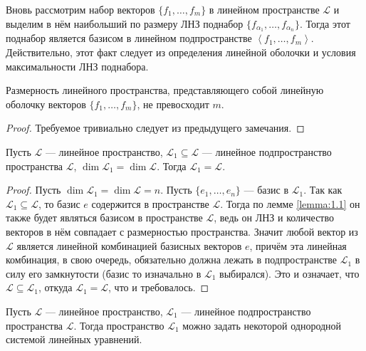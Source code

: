 \documentclass[11pt]{article}
\begin{document}
\begin{remark}
    Вновь рассмотрим набор векторов $\{f_1, \ldots, f_m\}$ в линейном пространстве $\mathcal{L}$ и выделим в нём 
    наибольший по размеру ЛНЗ поднабор $\{f_{\alpha_1}, \ldots, f_{\alpha_n}\}$. Тогда этот поднабор 
    является базисом в линейном подпространстве $\left\langle f_1, \ldots, f_m \right\rangle$. Действительно, этот 
    факт следует из определения линейной оболочки и условия максимальности ЛНЗ поднабора.
\end{remark}

\begin{lemma}
    Размерность линейного пространства, представляющего собой линейную оболочку векторов $\{f_1, \ldots, f_m\}$, не 
    превосходит $m$.
\end{lemma}

\begin{proof}
    Требуемое тривиально следует из предыдущего замечания.
\end{proof}

\begin{lemma}
    Пусть $\mathcal{L}$ --- линейное пространство, $\mathcal{L}_1 \subseteq \mathcal{L}$ --- линейное подпространство пространства $\mathcal{L}$, $\dim \mathcal{L}_1 = \dim \mathcal{L}$. Тогда $\mathcal{L}_1 = \mathcal{L}$.
\end{lemma}

\begin{proof}
    Пусть $\dim \mathcal{L}_1 = \dim \mathcal{L} = n$. Пусть $\{e_1, \ldots, e_n\}$ --- базис в $\mathcal{L}_1$. Так как $\mathcal{L}_1 \subseteq \mathcal{L}$, то базис $e$ содержится в пространстве $\mathcal{L}$.
    Тогда по лемме \ref{lemma:1.1} он также будет являться базисом в пространстве $\mathcal{L}$, ведь он ЛНЗ и количество векторов в нём совпадает с размерностью пространства. Значит любой 
    вектор из $\mathcal{L}$ является линейной комбинацией базисных векторов $e$, причём эта линейная комбинация, в свою очередь, обязательно должна лежать в подпространстве $\mathcal{L}_1$ в силу его замкнутости (базис то изначально в $\mathcal{L}_1$ выбирался).
    Это и означает, что $\mathcal{L} \subseteq \mathcal{L}_1$, откуда $\mathcal{L}_1 = \mathcal{L}$, что и требовалось.
\end{proof}

\begin{lemma}
    Пусть $\mathcal{L}$ --- линейное пространство, $\mathcal{L}_1$ --- линейное подпространство пространства $\mathcal{L}$.
    Тогда пространство $\mathcal{L}_1$ можно задать некоторой однородной системой линейных уравнений.
\end{lemma}
\end{document}
